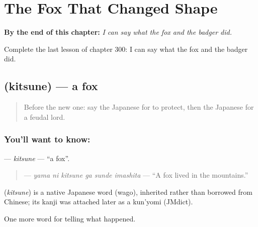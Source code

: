 
\chapter{The Fox That Changed Shape}
\label{ch:ja-the-fox-that-changed-shape}

\begin{chapteropening}
\textbf{By the end of this chapter:} \emph{I can say what the fox and the badger did.}

Complete the last lesson of chapter 300: I can say what the fox and the badger did.
\end{chapteropening}

\section[\texorpdfstring{\ja{きつね} (kitsune)}{きつね (kitsune)}]{ (kitsune) — a fox}

\label{lesson:JA-C300-kitsune}



\begin{quote}
Before the new one: say the Japanese for to protect, then the Japanese for a feudal lord.
\end{quote}

\subsection*{You'll want to know: }
\textbf{} — \emph{kitsune} — \textquotedblleft{}a fox\textquotedblright{}.

\begin{quote}
\textbf{  } — \emph{yama ni kitsune ga sunde imashita} — \textquotedblleft{}A fox lived in the mountains.\textquotedblright{}
\end{quote}

\begin{cousinweb}
\textbf{} (\emph{kitsune}) is a native Japanese word (wago), inherited rather than borrowed from Chinese; its kanji was attached later as a kun'yomi (JMdict).
\end{cousinweb}

\begin{grammarlens}[title={What you've built}]
One more word for telling what happened.
\end{grammarlens}

